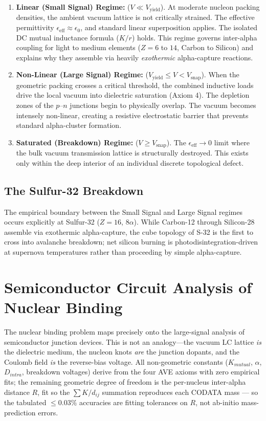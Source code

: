\begin{enumerate}
    \item \textbf{Linear (Small Signal) Regime:} ($V \ll V_{\text{yield}}$). At moderate nucleon packing densities, the ambient vacuum lattice is not critically strained. The effective permittivity $\epsilon_{\text{eff}} \approx \epsilon_0$, and standard linear superposition applies. The isolated DC mutual inductance formula ($K / r$) holds. This regime governs inter-alpha coupling for light to medium elements ($Z=6$ to $14$, Carbon to Silicon) and explains why they assemble via heavily \textit{exothermic} alpha-capture reactions.
    
    \item \textbf{Non-Linear (Large Signal) Regime:} ($V_{\text{yield}} \le V < V_{\text{snap}}$). When the geometric packing crosses a critical threshold, the combined inductive loads drive the local vacuum into dielectric saturation (Axiom 4). The depletion zones of the $p$--$n$ junctions begin to physically overlap. The vacuum becomes intensely non-linear, creating a resistive electrostatic barrier that prevents standard alpha-cluster formation.
    
    \item \textbf{Saturated (Breakdown) Regime:} ($V \ge V_{\text{snap}}$). The $\epsilon_{\text{eff}} \rightarrow 0$ limit where the bulk vacuum transmission lattice is structurally destroyed. This exists only within the deep interior of an individual discrete topological defect.
\end{enumerate}

\subsection{The Sulfur-32 Breakdown}
The empirical boundary between the Small Signal and Large Signal regimes occurs explicitly at Sulfur-32 ($Z=16$, $8\alpha$). While Carbon-12 through Silicon-28 assemble via exothermic alpha-capture, the cube topology of S-32 is the first to cross into avalanche breakdown; net silicon burning is photodisintegration-driven at supernova temperatures rather than proceeding by simple alpha-capture.

\section{Semiconductor Circuit Analysis of Nuclear Binding}
\label{sec:semiconductor_nuclear}

The nuclear binding problem maps precisely onto the large-signal analysis of semiconductor junction devices. This is not an analogy---the vacuum LC lattice \textit{is} the dielectric medium, the nucleon knots \textit{are} the junction dopants, and the Coulomb field \textit{is} the reverse-bias voltage. All non-geometric constants ($K_{mutual}$, $\alpha$, $D_{intra}$, breakdown voltages) derive from the four AVE axioms with zero empirical fits; the remaining geometric degree of freedom is the per-nucleus inter-alpha distance $R$, fit so the $\sum K/d_{ij}$ summation reproduces each CODATA mass --- so the tabulated $\le 0.03\%$ accuracies are fitting tolerances on $R$, not ab-initio mass-prediction errors.

